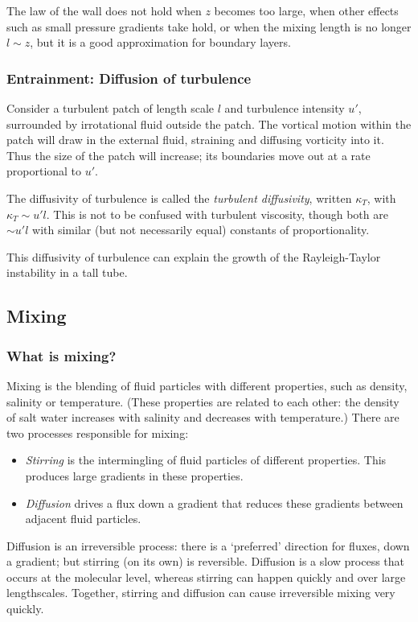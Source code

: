 The law of the wall does not hold when $z$ becomes too large, when other effects
such as small pressure gradients take hold, or when the mixing length is no
longer $l\sim z$, but it is a good approximation for boundary layers. 

\subsubsection{Entrainment: Diffusion of turbulence}

Consider a turbulent patch of length scale $l$ and turbulence intensity $u'$,
surrounded by irrotational fluid outside the patch. The vortical motion within
the patch will draw in the external fluid, straining and diffusing vorticity
into it. Thus the size of the patch will increase; its boundaries move out at a
rate proportional to $u'$. 

The diffusivity of turbulence is called the \textit{turbulent diffusivity},
written $\kappa_T$, with $\kappa_T \sim u'l$. This is not to be confused with
turbulent viscosity, though both are $\sim u'l$ with similar (but not
necessarily equal) constants of proportionality.

This diffusivity of turbulence can explain the growth of the Rayleigh-Taylor
instability in a tall tube. 

\subsection{Mixing}

\subsubsection{What is mixing?}

Mixing is the blending of fluid particles with different properties, such as density, salinity or temperature. (These properties are related to each other: the density of salt water increases with salinity and decreases with temperature.) There are two processes responsible for mixing:
\begin{itemize}
    \item \textit{Stirring} is the intermingling of fluid particles of different properties. This produces large gradients in these properties.
    \item \textit{Diffusion} drives a flux down a gradient that reduces these gradients between adjacent fluid particles.
\end{itemize}
Diffusion is an irreversible process: there is a `preferred' direction for fluxes, down a gradient; but stirring (on its own) is reversible. Diffusion is a slow process that occurs at the molecular level, whereas stirring can happen quickly and over large lengthscales. Together, stirring and diffusion can cause irreversible mixing very quickly.

